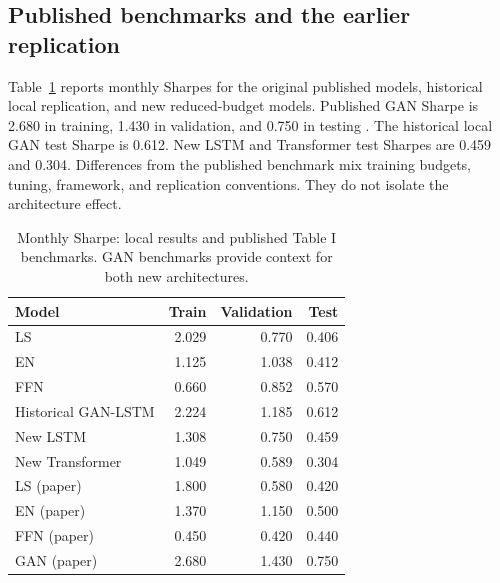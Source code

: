\documentclass[11pt]{article}
\begin{document}
\subsection{Published benchmarks and the earlier replication}
Table~\ref{tab:bench} reports monthly Sharpes for the original published models, historical local replication, and new reduced-budget models. Published GAN Sharpe is 2.680 in training, 1.430 in validation, and 0.750 in testing \cite{cpz}. The historical local GAN test Sharpe is 0.612. New LSTM and Transformer test Sharpes are 0.459 and 0.304. Differences from the published benchmark mix training budgets, tuning, framework, and replication conventions. They do not isolate the architecture effect.
\begin{table}[htbp]\centering\small
\caption{Monthly Sharpe: local results and published Table I benchmarks. GAN benchmarks provide context for both new architectures.}\label{tab:bench}
\begin{tabular}{lrrr}
\toprule
Model & Train & Validation & Test \\
\midrule
LS & 2.029 & 0.770 & 0.406 \\
EN & 1.125 & 1.038 & 0.412 \\
FFN & 0.660 & 0.852 & 0.570 \\
Historical GAN-LSTM & 2.224 & 1.185 & 0.612 \\
New LSTM & 1.308 & 0.750 & 0.459 \\
New Transformer & 1.049 & 0.589 & 0.304 \\
LS (paper) & 1.800 & 0.580 & 0.420 \\
EN (paper) & 1.370 & 1.150 & 0.500 \\
FFN (paper) & 0.450 & 0.420 & 0.440 \\
GAN (paper) & 2.680 & 1.430 & 0.750 \\
\bottomrule\end{tabular}\end{table}
\end{document}
